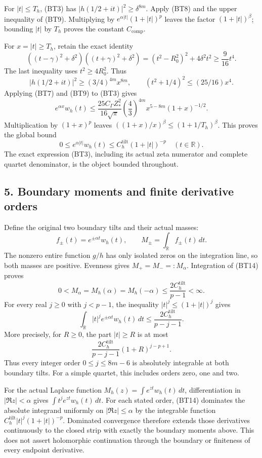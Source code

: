 For \(|t|\le T_h\), (BT3) has \(|h(1/2+it)|^2\ge\delta^{8m}\). Apply (BT8) and the upper inequality of (BT9). Multiplying by \(e^{\alpha|t|}(1+|t|)^p\) leaves the factor \((1+|t|)^\beta\); bounding \(|t|\) by \(T_h\) proves the constant \(C_{\mathrm{comp}}\).

For \(x=|t|\ge T_h\), retain the exact identity \[
((t-\gamma)^2+\delta^2)((t+\gamma)^2+\delta^2)
=(t^2-R_0^2)^2+4\delta^2t^2
\ge\frac9{16}t^4.
\tag{BT13}
\] The last inequality uses \(t^2\ge4R_0^2\). Thus \[
|h(1/2+it)|^2\ge(3/4)^{4m}x^{8m},
\qquad
(t^2+1/4)^2\le(25/16)x^4.
\] Applying (BT7) and (BT9) to (BT3) gives \[
e^{\alpha x}w_h(t)
\le\frac{25C_\Gamma Z_*^2}{16\sqrt\pi}
\left(\frac43\right)^{4m}
x^{5-8m}(1+x)^{-1/2}.
\] Multiplication by \((1+x)^p\) leaves \(((1+x)/x)^\beta\le(1+1/T_h)^\beta\). This proves the global bound \[
\boxed{
0\le e^{\alpha|t|}w_h(t)
\le C_h^{\mathrm{tilt}}(1+|t|)^{-p}
\quad(t\in\mathbb{R}).}
\tag{BT14}
\] The exact expression (BT3), including its actual zeta numerator and complete quartet denominator, is the object bounded throughout.

\subsection{5. Boundary moments and finite derivative orders}\label{GraphV2:boundary-moments-and-finite-derivative-orders}

Define the original two boundary tilts and their actual masses: \[
f_\pm(t)=e^{\pm\alpha t}w_h(t),\qquad
M_\pm=\int_{\mathbb{R}}f_\pm(t)\,dt.
\tag{BT15}
\] The nonzero entire function \(g/h\) has only isolated zeros on the integration line, so both masses are positive. Evenness gives \(M_+=M_-=:M_\alpha\). Integration of (BT14) proves \[
\boxed{
0<M_\alpha=M_h(\alpha)=M_h(-\alpha)
\le\frac{2C_h^{\mathrm{tilt}}}{p-1}<\infty.}
\tag{BT16}
\] For every real \(j\ge0\) with \(j<p-1\), the inequality \(|t|^j\le(1+|t|)^j\) gives \[
\int_{\mathbb{R}}|t|^j e^{\pm\alpha t}w_h(t)\,dt
\le\frac{2C_h^{\mathrm{tilt}}}{p-j-1}.
\tag{BT17}
\] More precisely, for \(R\ge0\), the part \(|t|\ge R\) is at most \[
\frac{2C_h^{\mathrm{tilt}}}{p-j-1}
(1+R)^{j-p+1}.
\tag{BT18}
\] Thus every integer order \(0\le j\le8m-6\) is absolutely integrable at both boundary tilts. For a simple quartet, this includes orders zero, one and two.

For the actual Laplace function \(M_h(z)=\int e^{zt}w_h(t)\,dt\), differentiation in \(|\Re z|<\alpha\) gives \(\int t^j e^{zt}w_h(t)\,dt\). For each stated order, (BT14) dominates the absolute integrand uniformly on \(|\Re z|\le\alpha\) by the integrable function \(C_h^{\mathrm{tilt}}|t|^j(1+|t|)^{-p}\). Dominated convergence therefore extends those derivatives continuously to the closed strip with exactly the boundary moments above. This does not assert holomorphic continuation through the boundary or finiteness of every endpoint derivative.

